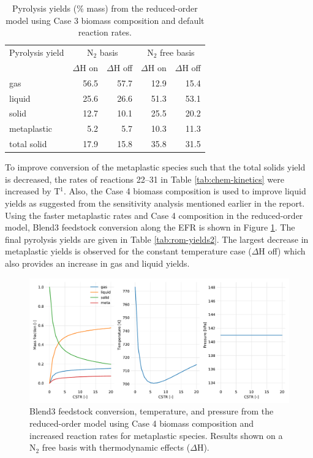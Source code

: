 \begin{table}[H]
    \centering
    \caption{Pyrolysis yields (\% mass) from the reduced-order model using Case 3 biomass composition and default reaction rates.}
    \label{tab:rom-yields1}
    \begin{tabular}{lrrrr}
        \toprule
        Pyrolysis yield & \multicolumn{2}{c}{N$_2$ basis} & \multicolumn{2}{c}{N$_2$ free basis} \\
        & $\Delta$H on & $\Delta$H off& $\Delta$H on & $\Delta$H off \\
        \midrule
        gas         & 56.5 & 57.7 & 12.9 & 15.4 \\
        liquid      & 25.6 & 26.6 & 51.3 & 53.1 \\
        solid       & 12.7 & 10.1 & 25.5 & 20.2 \\
        metaplastic & 5.2  & 5.7  & 10.3 & 11.3 \\
        total solid & 17.9 & 15.8 & 35.8 & 31.5 \\
        \bottomrule
    \end{tabular}
\end{table}

To improve conversion of the metaplastic species such that the total solids yield is decreased, the rates of reactions 22--31 in Table \ref{tab:chem-kinetics} were increased by T$^1$. Also, the Case 4 biomass composition is used to improve liquid yields as suggested from the sensitivity analysis mentioned earlier in the report. Using the faster metaplastic rates and Case 4 composition in the reduced-order model, Blend3 feedstock conversion along the EFR is shown in Figure \ref{fig:rom-yields2}. The final pyrolysis yields are given in Table \ref{tab:rom-yields2}. The largest decrease in metaplastic yields is observed for the constant temperature case ($\Delta$H off) which also provides an increase in gas and liquid yields.

\begin{figure}[H]
    \centering
    \includegraphics[width=\textwidth]{figures/rom-yields2.pdf}
    \caption{Blend3 feedstock conversion, temperature, and pressure from the reduced-order model using Case 4 biomass composition and increased reaction rates for metaplastic species. Results shown on a N$_2$ free basis with thermodynamic effects ($\Delta$H).}
    \label{fig:rom-yields2}
\end{figure}

